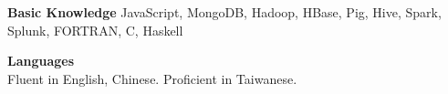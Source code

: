 \documentclass[12pt,letterpaper]{article}
\newenvironment{itemize*}%
{\begin{itemize}%
  \setlength{\itemsep}{0pt}}%
{\end{itemize}}
\newcommand{\mhead}[1]{\leavevmode\marginpar{\sffamily\footnotesize #1}}
\newcommand{\rdate}[1]{{\addfontfeature{Numbers=OldStyle} \hfill #1}}
\begin{document}
\smallskip
\textbf{Basic Knowledge}\newline%
JavaScript, MongoDB,  Hadoop, HBase, Pig, Hive, Spark, Splunk, FORTRAN, C, Haskell

\smallskip
\textbf{Languages}\\
Fluent in English, Chinese. Proficient in Taiwanese.

\bigskip
%
%
\end{document}
